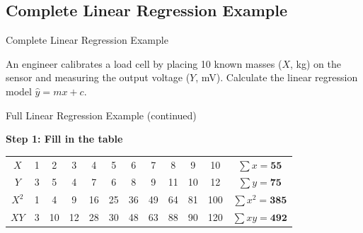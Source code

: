 \subsection{Complete Linear Regression Example}
\begin{frame}{Complete Linear Regression Example}
    \begin{example}
        An engineer calibrates a load cell by placing 10 known masses ($X$, kg) on the sensor and measuring the output voltage ($Y$, mV). Calculate the linear regression model $\hat{y} = mx + c$.
        
        \vspace{0.2cm}
        \centering
    \end{example}

\end{frame}
    
 
\begin{frame}{Full Linear Regression Example (continued)}
\begin{solution}
        \textbf{Step 1: Fill in the table}
          \begin{tabular}{c|cccccccccc|c}
            \hline
            \textbf{$X$} & 1 & 2 & 3 & 4 & 5 & 6 & 7 & 8 & 9 & 10 & $\sum x = \mathbf{55}$ \\
            \textbf{$Y$} & 3 & 5 & 4 & 7 & 6 & 8 & 9 & 11 & 10 & 12 & $\sum y = \mathbf{75}$ \\
            \hline
            \textbf{$X^2$} & 1 & 4 & 9 & 16 & 25 & 36 & 49 & 64 & 81 & 100 & $\sum x^2 = \mathbf{385}$ \\
            \textbf{$XY$} & 3 & 10 & 12 & 28 & 30 & 48 & 63 & 88 & 90 & 120 & $\sum xy = \mathbf{492}$ \\
            \hline
        \end{tabular}
        \end{solution}

\end{frame}


